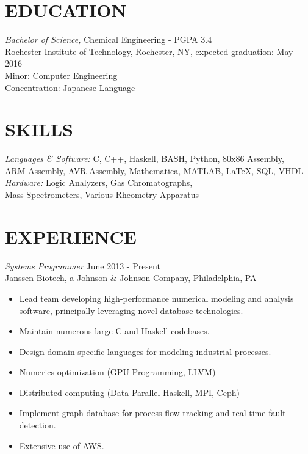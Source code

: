 \documentclass[line,margin]{res}
\begin{document}
\address{262 Academy Street, Mexico, NY 13114}
\address{(315) 391-7268 - tmw4661@rit.edu}
\address{https://github.com/TravisWhitaker}

\begin{resume}

\section{EDUCATION} {\sl Bachelor of Science,} Chemical Engineering - PGPA 3.4 \\
Rochester Institute of Technology, Rochester, NY,
expected graduation: May 2016 \\
Minor: Computer Engineering \\
Concentration: Japanese Language \\
\section{SKILLS} {\sl Languages \& Software:} C, C++, Haskell, BASH, Python, 80x86 Assembly, \\ARM Assembly, AVR Assembly, Mathematica, MATLAB, \LaTeX, SQL, VHDL \\
                 {\sl Hardware:} Logic Analyzers, Gas Chromatographs, \\Mass Spectrometers, Various Rheometry Apparatus\\

\section{EXPERIENCE} {\sl Systems Programmer} \hfill June 2013 - Present \\
		Janssen Biotech, a Johnson \& Johnson Company,
		Philadelphia, PA
		\begin{itemize}  \itemsep -2pt
		\item   Lead team developing high-performance numerical modeling and analysis software, principally leveraging novel database technologies.
		\item   Maintain numerous large C and Haskell codebases.
		\item   Design domain-specific languages for modeling industrial processes.
		\item   Numerics optimization (GPU Programming, LLVM)
		\item   Distributed computing (Data Parallel Haskell, MPI, Ceph)
		\item   Implement graph database for process flow tracking and real-time fault detection.
		\item   Extensive use of AWS.
		\end{itemize}


\end{resume}
\end{document}
